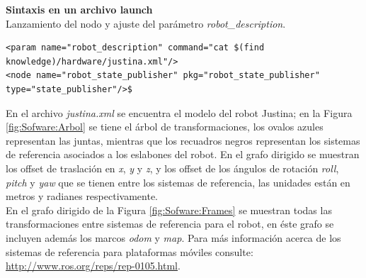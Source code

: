 \documentclass[12pt,twoside,final]{book}
\begin{document}
\textbf{Sintaxis en un archivo launch}\\
Lanzamiento del nodo y ajuste del parámetro \textit{robot\_description}.
\begin{verbatim}
<param name="robot_description" command="cat $(find knowledge)/hardware/justina.xml"/>
<node name="robot_state_publisher" pkg="robot_state_publisher" type="state_publisher"/>$
\end{verbatim}

En el archivo \textit{justina.xml} se encuentra el modelo del robot Justina; en la Figura  \ref{fig:Sofware:Arbol} se tiene el árbol de transformaciones, los ovalos azules representan las juntas, mientras que los recuadros negros representan los sistemas de referencia asociados a los eslabones del robot. En el grafo dirigido se muestran los offset de traslación en \textit{x}, \textit{y} y \textit{z}, y los offset de los ángulos de rotación \textit{roll}, \textit{pitch} y \textit{yaw} que se tienen entre los sistemas de referencia, las unidades están en metros y radianes respectivamente.\\

En el grafo dirigido de la Figura \ref{fig:Sofware:Frames} se muestran todas las transformaciones entre sistemas de referencia para el robot, en éste grafo se incluyen además los marcos \textit{odom} y \textit{map}. Para más información acerca de los sistemas de referencia para plataformas móviles consulte: \url{http://www.ros.org/reps/rep-0105.html}.
\end{document}
